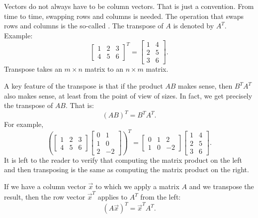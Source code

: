 Vectors do not always have to be column vectors.
That is just a convention.
From time to time,
swapping rows and columns is needed.
The operation that swaps rows and columns is the so-called
\emph{}.
The transpose of $A$ is denoted by $A^T$.  Example:
\begin{equation*}
\begin{bmatrix}
1 & 2 & 3 \\
4 & 5 & 6
\end{bmatrix}^T =
\begin{bmatrix}
1 & 4 \\
2 & 5 \\
3 & 6
\end{bmatrix} .
\end{equation*}
Transpose takes an $m \times n$ matrix to an $n \times m$ matrix.

A key feature of the transpose is that if the product $AB$ makes sense,
then $B^TA^T$ also makes sense, at least from the point of view of sizes.
In fact, we get precisely the transpose of $AB$.  That is:
\begin{equation*}
{(AB)}^T = B^TA^T .
\end{equation*}
For example,
\begin{equation*}
{\left(
\begin{bmatrix}
1 & 2 & 3 \\
4 & 5 & 6
\end{bmatrix}
\begin{bmatrix}
0 & 1 \\
1 & 0 \\
2 & -2
\end{bmatrix}
\right)}^T =
\begin{bmatrix}
0 & 1 & 2 \\
1 & 0 & -2
\end{bmatrix}
\begin{bmatrix}
1 & 4 \\
2 & 5 \\
3 & 6
\end{bmatrix} .
\end{equation*}
It is left to the reader to verify that computing the matrix product on the
left and then transposing is the same as computing the matrix product on the
right.

If we have a column vector $\vec{x}$ to which we apply a matrix $A$
and we transpose the result,
then the row vector $\vec{x}^T$ applies to $A^T$ from the left:
\begin{equation*}
{(A\vec{x})}^T = \vec{x}^TA^T .
\end{equation*}

